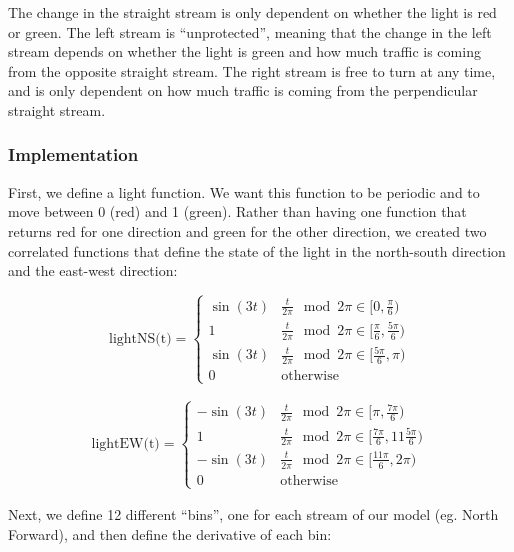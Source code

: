 \documentclass[12pt]{article}
\begin{document}
The change in the straight stream is only dependent on whether the light is red or green. The left stream is “unprotected”, meaning that the change in the left stream depends on whether the light is green and how much traffic is coming from the opposite straight stream. The right stream is free to turn at any time, and is only dependent on how much traffic is coming from the perpendicular straight stream.

\subsubsection{Implementation}

First, we define a light function. We want this function to be periodic and to move between 0 (red) and 1 (green). Rather than having one function that returns red for one direction and green for the other direction, we created two correlated functions that define the state of the light in the north-south direction and the east-west direction:

\[
\textrm{lightNS(t)} =
\begin{cases} 
    \sin(3t) & \frac{t}{ 2\pi} \mod 2 \pi\in [0, \frac{\pi}{6}) \\
    1 & \frac{t}{ 2\pi} \mod 2 \pi\in [\frac{\pi}{6},\frac{5\pi}{6}) \\
    \sin(3t) & \frac{t}{ 2\pi} \mod 2 \pi\in [\frac{5\pi}{6}, \pi) \\
    0 & \text{otherwise}
\end{cases}
\]




\begin{align*}
    \textrm{lightEW(t)} =
    \begin{cases} 
        -\sin(3t) & \frac{t}{2\pi} \mod 2 \pi \in [\pi,\frac{7\pi}{6} ) \\ 
        1 & \frac{t}{ 2\pi }\mod 2 \pi \in [\frac{7\pi}{6},11\frac{5\pi}{6} ) \\
        -\sin(3t) & \frac{t}{ 2\pi} \mod 2 \pi\in  [\frac{11\pi}{6}, 2 \pi) \\
        0 & \text{otherwise}
    \end{cases}
\end{align*}

Next, we define 12 different “bins”, one for each stream of our model (eg. North Forward), and then define the derivative of each bin:\\\\
\end{document}
